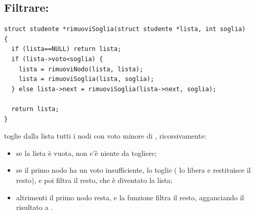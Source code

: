 \subsection{Filtrare: }

\begingroup
\codicepiccolo
\lstset{xleftmargin=19pt, framexleftmargin=15pt}
\begin{lstlisting}[style=c, name=funzioni.c, firstnumber=104]
struct studente *rimuoviSoglia(struct studente *lista, int soglia)
{
  if (lista==NULL) return lista;
  if (lista->voto<soglia) {
    lista = rimuoviNodo(lista, lista);
    lista = rimuoviSoglia(lista, soglia);
  } else lista->next = rimuoviSoglia(lista->next, soglia);

  return lista;
}
\end{lstlisting}
\endgroup

 toglie dalla lista tutti i nodi con voto minore di
, ricorsivamente:

\begin{itemize}
  \item se la lista è vuota, non c'è niente da togliere;
  \item se il primo nodo ha un voto insufficiente, lo toglie
        ( lo libera e restituisce il resto),
        e poi filtra il resto, che è diventato la lista;
  \item altrimenti il primo nodo resta, e la funzione filtra il resto,
        agganciando il risultato a .
\end{itemize}

